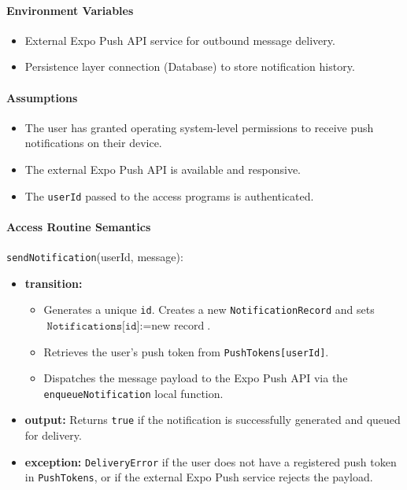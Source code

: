 \paragraph{Environment Variables}
\begin{itemize}
    \item External Expo Push API service for outbound message delivery.
    \item Persistence layer connection (Database) to store notification history.
\end{itemize}

\paragraph{Assumptions}
\begin{itemize}
    \item The user has granted operating system-level permissions to receive push notifications on their device.
    \item The external Expo Push API is available and responsive.
    \item The \texttt{userId} passed to the access programs is authenticated.
\end{itemize}

\paragraph{Access Routine Semantics}

\texttt{sendNotification}(userId, message):
\begin{itemize}
    \item \textbf{transition:} 
    \begin{itemize}
        \item Generates a unique \texttt{id}. Creates a new \texttt{NotificationRecord} and sets $\texttt{Notifications[id]} := \text{new record}$.
        \item Retrieves the user's push token from \texttt{PushTokens[userId]}.
        \item Dispatches the message payload to the Expo Push API via the \texttt{enqueueNotification} local function.
    \end{itemize}
    \item \textbf{output:} Returns \texttt{true} if the notification is successfully generated and queued for delivery.
    \item \textbf{exception:} \texttt{DeliveryError} if the user does not have a registered push token in \texttt{PushTokens}, or if the external Expo Push service rejects the payload.
\end{itemize}

